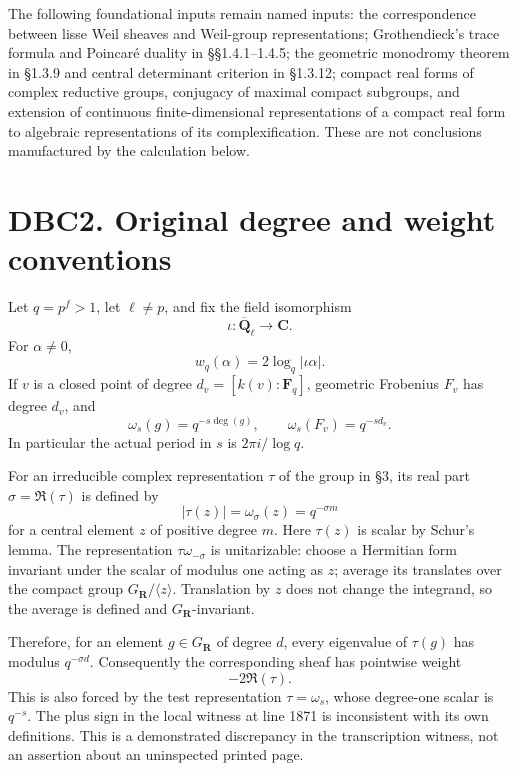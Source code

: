 \documentclass[
]{report}
\begin{document}
The following foundational inputs remain named inputs: the
correspondence between lisse Weil sheaves and Weil-group
representations; Grothendieck's trace formula and Poincaré duality in
§§1.4.1--1.4.5; the geometric monodromy theorem in §1.3.9 and central
determinant criterion in §1.3.12; compact real forms of complex
reductive groups, conjugacy of maximal compact subgroups, and extension
of continuous finite-dimensional representations of a compact real form
to algebraic representations of its complexification. These are not
conclusions manufactured by the calculation below.

\section{DBC2. Original degree and weight
conventions}\label{dbc2.-original-degree-and-weight-conventions}

Let \(q=p^f>1\), let \(\ell\ne p\), and fix the field isomorphism \[
\iota:\overline{\mathbf Q}_\ell\longrightarrow\mathbf C.
\] For \(\alpha\ne0\), \[
w_q(\alpha)=2\log_q|\iota\alpha|.
\tag{DBC.2.1}
\] If \(v\) is a closed point of degree \(d_v=[k(v):\mathbf F_q]\),
geometric Frobenius \(F_v\) has degree \(d_v\), and \[
\omega_s(g)=q^{-s\deg(g)},\qquad
\omega_s(F_v)=q^{-s d_v}.
\tag{DBC.2.2}
\] In particular the actual period in \(s\) is \(2\pi i/\log q\).

For an irreducible complex representation \(\tau\) of the group in §3,
its real part \(\sigma=\Re(\tau)\) is defined by \[
|\tau(z)|=\omega_\sigma(z)=q^{-\sigma m}
\tag{DBC.2.3}
\] for a central element \(z\) of positive degree \(m\). Here
\(\tau(z)\) is scalar by Schur's lemma. The representation
\(\tau\omega_{-\sigma}\) is unitarizable: choose a Hermitian form
invariant under the scalar of modulus one acting as \(z\); average its
translates over the compact group \(G_{\mathbf R}/\langle z\rangle\).
Translation by \(z\) does not change the integrand, so the average is
defined and \(G_{\mathbf R}\)-invariant.

Therefore, for an element \(g\in G_{\mathbf R}\) of degree \(d\), every
eigenvalue of \(\tau(g)\) has modulus \(q^{-\sigma d}\). Consequently
the corresponding sheaf has pointwise weight \[
\boxed{-2\Re(\tau)}.
\tag{DBC.2.4}
\] This is also forced by the test representation \(\tau=\omega_s\),
whose degree-one scalar is \(q^{-s}\). The plus sign in the local
witness at line 1871 is inconsistent with its own definitions. This is a
demonstrated discrepancy in the transcription witness, not an assertion
about an uninspected printed page.
\end{document}
